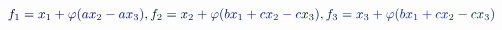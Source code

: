 \documentclass[12pt]{article}
\begin{document}
\makeatletter
\renewcommand*{\@textcolor}[3]{%
  \protect\leavevmode
  \begingroup
    \color#1{#2}#3%
  \endgroup
}
\makeatother
\begin{displaymath}
\begin{array} {l} \mathcolor[RGB]{0,0,15}{\textstyle} { \mathcolor[RGB]{0,0,30}{f} _ { \mathcolor[RGB]{0,0,45}{1} } \mathcolor[RGB]{0,0,60}{=} \mathcolor[RGB]{0,0,75}{x} _ { \mathcolor[RGB]{0,0,90}{1} } \mathcolor[RGB]{0,0,105}{+} \mathcolor[RGB]{0,0,120}{\varphi} \mathcolor[RGB]{0,0,135}{(} \mathcolor[RGB]{0,0,150}{a} \mathcolor[RGB]{0,0,165}{x} _ { \mathcolor[RGB]{0,0,180}{2} } \mathcolor[RGB]{0,0,195}{-} \mathcolor[RGB]{0,0,210}{a} \mathcolor[RGB]{0,0,225}{x} _ { \mathcolor[RGB]{0,0,240}{3} } \mathcolor[RGB]{0,0,255}{)} \mathcolor[RGB]{0,15,0}{,} \mathcolor[RGB]{0,15,15}{f} _ { \mathcolor[RGB]{0,15,30}{2} } \mathcolor[RGB]{0,15,45}{=} \mathcolor[RGB]{0,15,60}{x} _ { \mathcolor[RGB]{0,15,75}{2} } \mathcolor[RGB]{0,15,90}{+} \mathcolor[RGB]{0,15,105}{\varphi} \mathcolor[RGB]{0,15,120}{(} \mathcolor[RGB]{0,15,135}{b} \mathcolor[RGB]{0,15,150}{x} _ { \mathcolor[RGB]{0,15,165}{1} } \mathcolor[RGB]{0,15,180}{+} \mathcolor[RGB]{0,15,195}{c} \mathcolor[RGB]{0,15,210}{x} _ { \mathcolor[RGB]{0,15,225}{2} } \mathcolor[RGB]{0,15,240}{-} \mathcolor[RGB]{0,15,255}{c} \mathcolor[RGB]{0,30,0}{x} _ { \mathcolor[RGB]{0,30,15}{3} } \mathcolor[RGB]{0,30,30}{)} \mathcolor[RGB]{0,30,45}{,} \mathcolor[RGB]{0,30,60}{f} _ { \mathcolor[RGB]{0,30,75}{3} } \mathcolor[RGB]{0,30,90}{=} \mathcolor[RGB]{0,30,105}{x} _ { \mathcolor[RGB]{0,30,120}{3} } \mathcolor[RGB]{0,30,135}{+} \mathcolor[RGB]{0,30,150}{\varphi} \mathcolor[RGB]{0,30,165}{(} \mathcolor[RGB]{0,30,180}{b} \mathcolor[RGB]{0,30,195}{x} _ { \mathcolor[RGB]{0,30,210}{1} } \mathcolor[RGB]{0,30,225}{+} \mathcolor[RGB]{0,30,240}{c} \mathcolor[RGB]{0,30,255}{x} _ { \mathcolor[RGB]{0,45,0}{2} } \mathcolor[RGB]{0,45,15}{-} \mathcolor[RGB]{0,45,30}{c} \mathcolor[RGB]{0,45,45}{x} _ { \mathcolor[RGB]{0,45,60}{3} } \mathcolor[RGB]{0,45,75}{)} } \end{array}
\end{displaymath}
\end{document}
